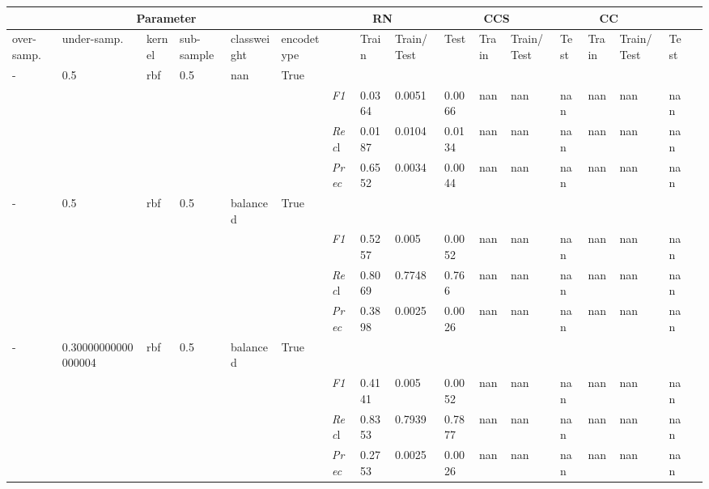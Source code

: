 \begin{table}[]
\tiny
\tabcolsep=0.11cm
\begin{tabularx}{\textwidth}{XXXXXX|X|XXX|XXX|XXXX}
\toprule
\multicolumn{6}{c}{Parameter} & \multicolumn{3}{c}{RN} & \multicolumn{3}{c}{CCS} & \multicolumn{3}{c}{CC} \\ \midrule
over-\newline samp. & under-\newline samp. & kernel &sub-\newline sample & class\newline weight & encode\newline type & & Train & Train/\newline Test & Test & Train & Train/\newline Test & Test & Train & Train/\newline Test & Test \\ \midrule
- & 0.5 & rbf & 0.5 & nan &True & & & & & & & & & \\
& & & & & & \textit{F1} & 0.0364 & 0.0051 & 0.0066 & nan & nan        & nan        & nan        & nan        & nan        \\
& & & & & & \textit{Rec}l & 0.0187 & 0.0104 & 0.0134    & nan & nan    & nan    & nan    & nan    & nan    \\
& & & & & & \textit{Prec} & 0.6552 & 0.0034 & 0.0044 & nan & nan & nan & nan & nan & nan \\ \midrule
- & 0.5 & rbf & 0.5 & balanced &True & & & & & & & & & \\
& & & & & & \textit{F1} & 0.5257 & 0.005 & 0.0052 & nan & nan        & nan        & nan        & nan        & nan        \\
& & & & & & \textit{Rec}l & 0.8069 & 0.7748 & 0.766    & nan & nan    & nan    & nan    & nan    & nan    \\
& & & & & & \textit{Prec} & 0.3898 & 0.0025 & 0.0026 & nan & nan & nan & nan & nan & nan \\ \midrule
- & 0.30000000000000004 & rbf & 0.5 & balanced &True & & & & & & & & & \\
& & & & & & \textit{F1} & 0.4141 & 0.005 & 0.0052 & nan & nan        & nan        & nan        & nan        & nan        \\
& & & & & & \textit{Rec}l & 0.8353 & 0.7939 & 0.7877    & nan & nan    & nan    & nan    & nan    & nan    \\
& & & & & & \textit{Prec} & 0.2753 & 0.0025 & 0.0026 & nan & nan & nan & nan & nan & nan \\ \midrule

\end{tabularx}
\end{table}
